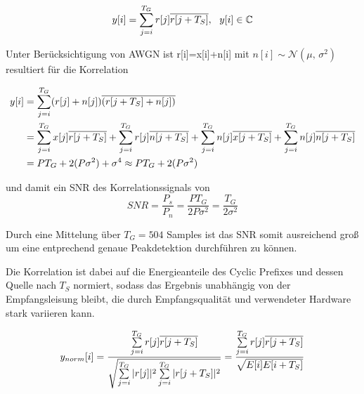\begin{equation}
y[i] = \sum \limits_{j=i}^{T_G}r[j] \overline{r[j+T_S]}, \ \ y[i] \in \mathbb{C}
\label{eq:corr_einfach}
\end{equation}

Unter Berücksichtigung von AWGN ist r[i]=x[i]+n[i] mit $n[i] \sim \mathcal{N}(\mu,\,\sigma^{2})$ resultiert für die Korrelation

\begin{equation}
    \begin{aligned}
y[i] &= \sum \limits_{j=i}^{T_G}(r[j]+n[j]) \overline{(r[j+T_S]+n[j])} \\
&= \sum \limits_{j=i}^{T_G}x[j] \overline{r[j+T_S]} + \sum \limits_{j=i}^{T_G}r[j] \overline{n[j+T_S]} + \sum \limits_{j=i}^{T_G}n[j] \overline{x[j+T_S]} + \sum \limits_{j=i}^{T_G}n[j] \overline{n[j+T_S]} \\
&= P T_G + 2(P \sigma^2) + \sigma^4 \approx P T_G + 2(P \sigma^2)
    \end{aligned}
\end{equation}

und damit ein SNR des Korrelationssignals von
\begin{equation}
SNR = \frac{P_s}{P_n} = \frac{P T_G}{2 P \sigma^2} = \frac{T_G}{2 \sigma^2}
\end{equation}

Durch eine Mittelung über $T_G = 504$ Samples ist das SNR somit ausreichend groß um eine entprechend genaue Peakdetektion durchführen zu können.

Die Korrelation ist dabei auf die Energieanteile des Cyclic Prefixes und dessen Quelle nach $T_S$ normiert, sodass das Ergebnis unabhängig von der Empfangsleisung bleibt, die durch Empfangsqualität und verwendeter Hardware stark variieren kann.

\begin{equation}
    y_{norm}[i] = \frac{\sum \limits_{j=i}^{T_G}r[j] \overline{r[j+T_S]}}{\sqrt{\sum \limits_{j=i}^{T_G}|r[j]|^2 \sum \limits_{j=i}^{T_G}|r[j+T_S]|^2}} = \frac{\sum \limits_{j=i}^{T_G}r[j]     \overline{r[j+T_S]}}{\sqrt{E[i]E[i+T_S]}}
    \label{eq:norm_corr}
\end{equation}

